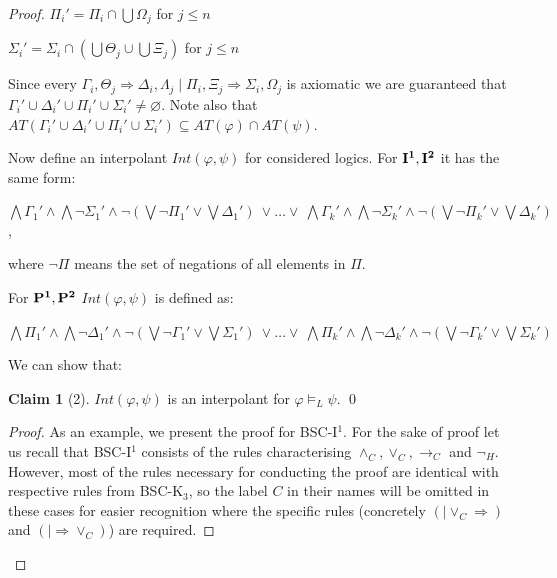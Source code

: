 \documentclass[10pt,a4paper]{article}
\theoremstyle{definition}
\newtheorem{claim}{Claim}[section]
\newcommand{\3}{\vspace{.3in}}
\newcommand{\2}{\vspace{.2in}}
\newcommand{\1}{\vspace{.1in}}
\newcommand{\5}{\vspace{.05in}}
\begin{document}
\begin{proof}
$\Pi_i' = \Pi_i\cap\bigcup\Omega_j$ for $j\leq n$

$\Sigma_i' = \Sigma_i\cap (\bigcup\Theta_j\cup\bigcup\Xi_j)$ for $j\leq n$

\1

Since every
$\Gamma_i, \Theta_j\Rightarrow\Delta_i, \Lambda_j\mid\Pi_i, \Xi_j\Rightarrow\Sigma_i, \Omega_j$ is axiomatic we are guaranteed that $\Gamma_i'\cup\Delta_i'\cup\Pi_i'\cup\Sigma_i'\neq \varnothing$.
Note also that $AT(\Gamma_i'\cup\Delta_i'\cup\Pi_i'\cup\Sigma_i') \subseteq AT(\varphi)\cap AT(\psi)$.



Now define an interpolant $Int(\varphi, \psi)$ for considered logics. For ${\bf I^1, I^2}$  it has the same form:

\1

\noindent $\bigwedge\Gamma_1' \wedge \bigwedge\neg\Sigma_1'\wedge \neg(\bigvee\neg\Pi_1'\vee\bigvee\Delta_1') \ \vee \ldots \vee \ \bigwedge\Gamma_k' \wedge \bigwedge\neg\Sigma_k'\wedge \neg(\bigvee\neg\Pi_k'\vee\bigvee\Delta_k')$, 

\1

\noindent where $\neg\Pi$ means the set of negations of all elements in $\Pi$.

\1

For ${\bf P^1, P^2}$ $Int(\varphi, \psi)$ is defined as:

\1

$\bigwedge\Pi_1' \wedge \bigwedge\neg\Delta_1'\wedge \neg(\bigvee\neg\Gamma_1'\vee\bigvee\Sigma_1') \ \vee \ldots \vee \ \bigwedge\Pi_k' \wedge \bigwedge\neg\Delta_k'\wedge \neg(\bigvee\neg\Gamma_k'\vee\bigvee\Sigma_k')$


\1

We can show that:

\begin{claim}[2]
	$Int(\varphi, \psi)$ is an interpolant for $\varphi\models_L\psi$. \qed
\end{claim}
\begin{proof}
As an example, we present the proof for BSC-I$^1$.  For the sake of proof let us recall that BSC-I$^1$ consists of the rules characterising $\wedge_C, \vee_C, \rightarrow_C$ and $\neg_H$. However, most of the rules necessary for conducting the proof are identical with respective rules from BSC-K$_3$, so the label $C$ in their names will be omitted in these cases for easier recognition where the specific rules (concretely  $(\mid\vee_C\Rightarrow)$ and $(\mid\Rightarrow\vee_C)$) are required.


\end{proof}
\end{proof}
\end{document}
